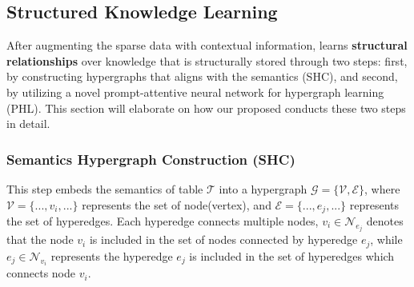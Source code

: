 \subsection{Structured Knowledge Learning}
After augmenting the sparse data with contextual information, \name learns \textbf{structural relationships} over knowledge that is structurally stored through two steps: first, by constructing hypergraphs that aligns with the semantics (SHC), and second, by utilizing a novel prompt-attentive neural network for hypergraph learning (PHL). This section will elaborate on how our proposed \name conducts these two steps in detail.

\subsubsection{Semantics Hypergraph Construction (SHC)} \label{sec:SHC}
This step embeds the semantics of table $\mathcal{T}$ into a hypergraph $\mathcal{G}=\{\mathcal{V},\mathcal{E}\}$, where $\mathcal{V}=\{..., v_{i}, ...\}$ represents the set of node(vertex), and $\mathcal{E}=\{..., e_{j}, ...\}$ represents the set of hyperedges. Each hyperedge connects multiple nodes, $v_i\in \mathcal{N}_{e_j}$ denotes that the node $v_i$ is included in the set of nodes connected by hyperedge $e_j$, while $e_j\in\mathcal{N}_{v_i}$ represents the hyperedge $e_j$ is included in the set of hyperedges which connects node $v_i$. %
